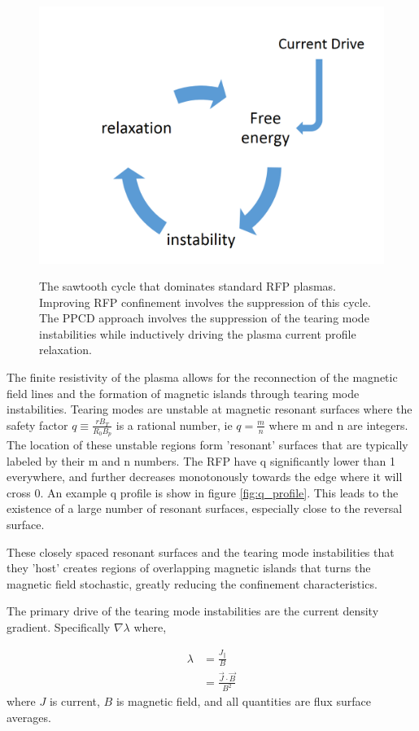 \begin{refsection}

\begin{figure}[!htb]
	\centering
	\includegraphics[width = .6\linewidth]{./1_Introduction/the_sawtooth_cycle.PNG}
	\label{fig:sawtooth_cycle}
	\caption[The sawtooth cycle]{The sawtooth cycle that dominates standard RFP plasmas. Improving RFP confinement involves the suppression of this cycle. The PPCD approach involves the suppression of the tearing mode instabilities while inductively driving the plasma current profile relaxation.}
\end{figure}%

The finite resistivity of the plasma allows for the reconnection of the
magnetic field lines and the formation of magnetic islands through tearing mode
instabilities. Tearing modes are unstable at magnetic resonant surfaces where
the safety factor $q \equiv \frac{rB_T}{R_0B_p}$ is a rational number, ie $q =
\frac{m}{n}$ where m and n are integers. The location of these unstable regions
form 'resonant' surfaces that are typically labeled by their m and n numbers.
The RFP have q significantly lower than 1 everywhere, and further decreases
monotonously towards the edge where it will cross 0. An example q profile is
show in figure \ref{fig:q_profile}. This leads to the existence of a large
number of resonant surfaces, especially close to the reversal surface. 

These closely spaced resonant surfaces and the tearing mode instabilities that
they 'host' creates regions of overlapping magnetic islands that turns the
magnetic field stochastic, greatly reducing the confinement characteristics.

The primary drive of the tearing mode instabilities are the current density gradient\cite{Schnack1987Semi-implicitCalculations,Ho1991NonlinearPinches}. Specifically $\nabla\lambda$ where,

\begin{align}
    \lambda &= \frac{J_{\parallel}}{B}\\
    &= \frac{\vec{J}\cdot\vec{B}}{B^2}\nonumber
\end{align}
where $J$ is current, $B$ is magnetic field, and all quantities are flux surface averages. 


\end{refsection}
